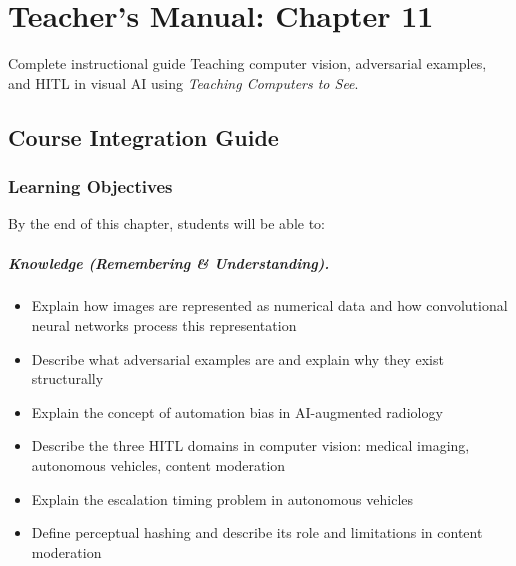 
\chapter{Teacher's Manual: Chapter 11}
\label{ch:teacher-ch11}

\begin{chapterquote}{Complete instructional guide}
Teaching computer vision, adversarial examples, and HITL in visual AI using \emph{Teaching Computers to See}.
\end{chapterquote}

\section{Course Integration Guide}

\subsection{Learning Objectives}

By the end of this chapter, students will be able to:

\paragraph{Knowledge (Remembering \& Understanding).}
\begin{itemize}
    \item Explain how images are represented as numerical data and how convolutional neural networks process this representation
    \item Describe what adversarial examples are and explain why they exist structurally
    \item Explain the concept of automation bias in AI-augmented radiology
    \item Describe the three HITL domains in computer vision: medical imaging, autonomous vehicles, content moderation
    \item Explain the escalation timing problem in autonomous vehicles
    \item Define perceptual hashing and describe its role and limitations in content moderation
\end{itemize}

